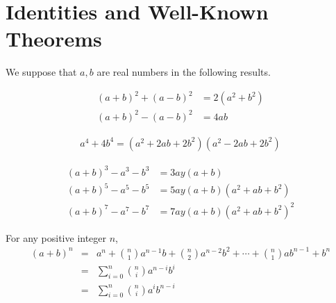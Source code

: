 \documentclass[main.tex]{subfile}
\begin{document}
\noappendicestocpagenum
\addappheadtotoc
\begin{appendix}\label{ch:appendices}
	\chapter*{Identities and Well-Known Theorems}\label{ch:null}

	We suppose that $a,b$ are real numbers in the following results\watermark.

	\begin{identity}\label{id:diffsqr}
		\begin{align*}
			(a+b)^2+(a-b)^2 &= 2(a^2+b^2)\\
			(a+b)^2-(a-b)^2 & = 4ab
		\end{align*}
	\end{identity}

	\begin{identity}
		\begin{align*}
			a^4+4b^4=(a^2+2ab+2b^2)(a^2-2ab+2b^2)
		\end{align*}
	\end{identity}

	\begin{identity}
		\begin{align*}
			(a+b)^3 - a^3 - b^3 &= 3ay(a+b)\\
			(a+b)^5 - a^5 - b^5 &= 5ay(a+b)(a^2+ab+b^2)\\
			(a+b)^7 - a^7 - b^7 &= 7ay(a+b)(a^2+ab+b^2)^2
		\end{align*}
	\end{identity}

	\begin{identity}\label{thm:binomial-theorem}
		For any positive integer $n$,
		\begin{eqnarray*}
			(a+b)^n & = & a^n+\binom{n}{1}a^{n-1}b+\binom{n}{2}a^{n-2}b^2+\cdots+\binom{n}{1}ab^{n-1}+b^n\\
			& = & \sum_{i=0}^{n}\binom{n}{i}a^{n-i}b^i\\
			& = & \sum_{i=0}^{n}\binom{n}{i}a^ib^{n-i}
		\end{eqnarray*}
	\end{identity}


\end{appendix}
\end{document}
